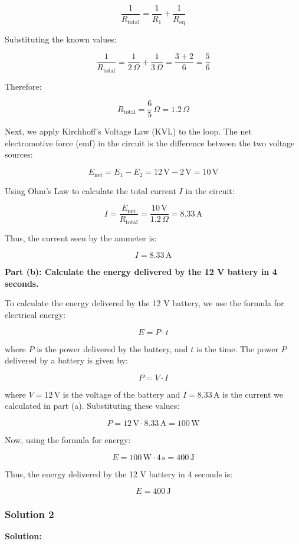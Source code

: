 \documentclass{article}
\begin{document}
\[
\frac{1}{R_{\text{total}}} = \frac{1}{R_1} + \frac{1}{R_{\text{eq}}}
\]

Substituting the known values:

\[
\frac{1}{R_{\text{total}}} = \frac{1}{2 \, \Omega} + \frac{1}{3 \, \Omega} = \frac{3 + 2}{6} = \frac{5}{6}
\]

Therefore:

\[
R_{\text{total}} = \frac{6}{5} \, \Omega = 1.2 \, \Omega
\]

Next, we apply Kirchhoff’s Voltage Law (KVL) to the loop. The net electromotive force (emf) in the circuit is the difference between the two voltage sources:

\[
E_{\text{net}} = E_1 - E_2 = 12 \, \text{V} - 2 \, \text{V} = 10 \, \text{V}
\]

Using Ohm’s Law to calculate the total current \( I \) in the circuit:

\[
I = \frac{E_{\text{net}}}{R_{\text{total}}} = \frac{10 \, \text{V}}{1.2 \, \Omega} = 8.33 \, \text{A}
\]

Thus, the current seen by the ammeter is:

\[
I = 8.33 \, \text{A}
\]

\textbf{Part (b): Calculate the energy delivered by the 12 V battery in 4 seconds.}

To calculate the energy delivered by the 12 V battery, we use the formula for electrical energy:

\[
E = P \cdot t
\]

where \( P \) is the power delivered by the battery, and \( t \) is the time. The power \( P \) delivered by a battery is given by:

\[
P = V \cdot I
\]

where \( V = 12 \, \text{V} \) is the voltage of the battery and \( I = 8.33 \, \text{A} \) is the current we calculated in part (a). Substituting these values:

\[
P = 12 \, \text{V} \cdot 8.33 \, \text{A} = 100 \, \text{W}
\]

Now, using the formula for energy:

\[
E = 100 \, \text{W} \cdot 4 \, \text{s} = 400 \, \text{J}
\]

Thus, the energy delivered by the 12 V battery in 4 seconds is:

\[
E = 400 \, \text{J}
\]


\subsubsection{Solution 2}
\textbf{Solution:}
\end{document}
